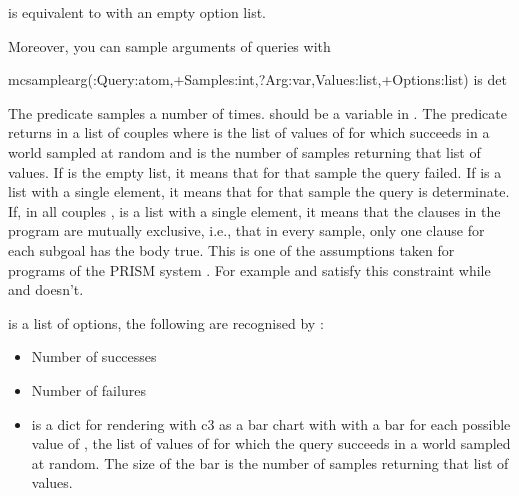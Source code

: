 \documentclass[letterpaper,10pt,english]{sphinxmanual}
\begin{document}
 is equivalent to  with an empty option list.

Moreover, you can sample arguments of queries with

\begin{sphinxVerbatim}[commandchars=\\\{\}]
mc\PYGZus{}sample\PYGZus{}arg(:Query:atom,+Samples:int,?Arg:var,\PYGZhy{}Values:list,+Options:list) is det
\end{sphinxVerbatim}

The predicate samples  a number of  times.  should be a variable in .
The predicate returns in  a list of couples  where  is the list of values of  for which  succeeds in a world sampled at random and  is the number of samples returning that list of values. If  is the empty list, it means that for that sample the query failed.
If  is a list with a single element, it means that for that sample the query is determinate.
If, in all couples ,  is a list with a single element, it means that the clauses in the program are mutually exclusive, i.e., that in every sample, only one clause for each subgoal has the body true.
This is one of the assumptions taken for programs of the PRISM system .
For example  and  satisfy this constraint while  and  doesn’t.

 is a list of options, the following are recognised by :
\begin{itemize}
\item {} 
 Number of successes

\item {} 
 Number of failures

\item {} 
  is a dict for rendering with c3 as a bar chart with with a bar for each possible value of , the list of values of  for which the query succeeds in a world sampled at random. The size of the bar is the number of samples returning that list of values.

\end{itemize}
\end{document}
